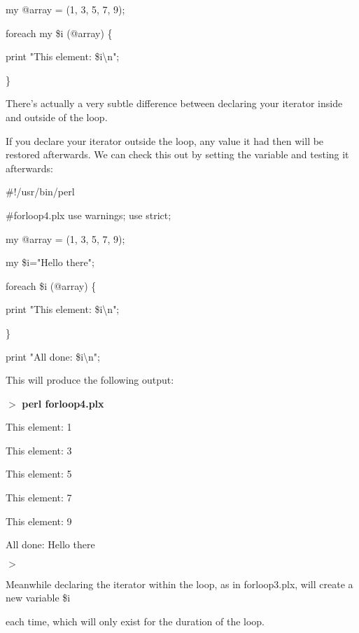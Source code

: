 \documentclass[a4paper,11pt]{book}
\begin{document}
\noindent my @array = (1, 3, 5, 7, 9);

\noindent foreach my \$i (@array) \{

\noindent print "This element: \$i\textbackslash n";

\noindent \}

\noindent 

\noindent There's actually a very subtle difference between declaring your iterator inside and outside of the loop.

\noindent If you declare your iterator outside the loop, any value it had then will be restored afterwards. We can check this out by setting the variable and testing it afterwards:

\noindent 

\noindent \#!/usr/bin/perl

\noindent \#forloop4.plx use warnings; use strict;

\noindent 

\noindent my @array = (1, 3, 5, 7, 9);

\noindent my \$i="Hello there";

\noindent foreach \$i (@array) \{

\noindent print "This element: \$i\textbackslash n";

\noindent \}

\noindent print "All done: \$i\textbackslash n";

\noindent 

\noindent This will produce the following output:

\noindent 

\noindent $>$ \textbf{perl forloop4.plx}

\noindent This element: 1

\noindent This element: 3

\noindent This element: 5

\noindent This element: 7

\noindent This element: 9

\noindent All done: Hello there

\noindent $>$

\noindent 

\noindent 

\noindent Meanwhile declaring the iterator within the loop, as in forloop3.plx, will create a new variable \$i

\noindent each time, which will only exist for the duration of the loop.

\noindent 
\end{document}
